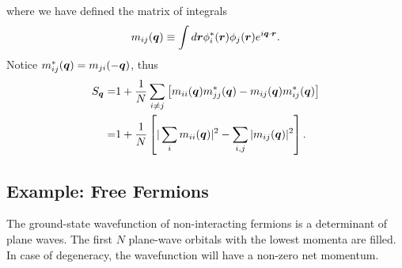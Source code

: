 where we have defined the matrix of integrals
\begin{align}
m_{ij}(\boldsymbol{q}) \equiv \int d\boldsymbol{r} \phi_i^*(\boldsymbol{r}) \phi_j(\boldsymbol{r}) e^{i\boldsymbol{q}\cdot\boldsymbol{r}}. \label{eq:det-mijq}
\end{align}
Notice $m_{ij}^*(\boldsymbol{q}) = m_{ji}(-\boldsymbol{q})$, thus
\begin{align}
S_{\boldsymbol{q}} =& 1+\frac{1}{N} \sum_{i\neq j} \left[ m_{ii}(\boldsymbol{q})m_{jj}^*(\boldsymbol{q}) - m_{ij}(\boldsymbol{q})m_{ij}^*(\boldsymbol{q}) \right] \nonumber \\
=& 1+\frac{1}{N} \left[
\vert \sum_{i} m_{ii}(\boldsymbol{q}) \vert^2 -\sum_{i, j} \vert m_{ij}(\boldsymbol{q}) \vert^2
\right]. \label{eq:det-sofk}
\end{align}

\subsection{Example: Free Fermions}
The ground-state wavefunction of non-interacting fermions is a determinant of plane waves. The first $N$ plane-wave orbitals with the lowest momenta are filled. In case of degeneracy, the wavefunction will have a non-zero net momentum. %

